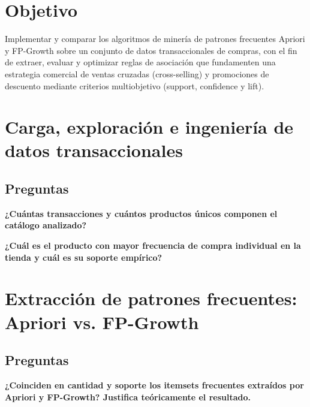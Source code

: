 \documentclass[letterpaper,11pt]{article}
\begin{document}
\begingroup
\onehalfspacing


\endgroup

\clearpage
{
  \makeatletter
  \let\ps@plain\ps@indice
  \makeatother
  \pagestyle{indice}
  \thispagestyle{indice}
  \hypersetup{linkcolor=black}\tableofcontents
  \thispagestyle{indice}
}
\clearpage


\setcounter{page}{1}


\section{Objetivo}

Implementar y comparar los algoritmos de minería de patrones frecuentes Apriori y FP-Growth sobre un
conjunto de datos transaccionales de compras, con el fin de extraer, evaluar y optimizar reglas de asociación
que fundamenten una estrategia comercial de ventas cruzadas (cross-selling) y promociones de descuento
mediante criterios multiobjetivo (support, confidence y lift).

\newpage

\section{Carga, exploración e ingeniería de datos transaccionales}

\subsection{Preguntas}

\textbf{¿Cuántas transacciones y cuántos productos únicos componen el catálogo analizado?}

\textbf{¿Cuál es el producto con mayor frecuencia de compra individual en la tienda y cuál es su soporte
empírico?}

\newpage

\section{Extracción de patrones frecuentes: Apriori vs. FP-Growth}

\subsection{Preguntas}

\textbf{¿Coinciden en cantidad y soporte los itemsets frecuentes extraídos por Apriori y FP-Growth?
Justifica teóricamente el resultado.}
\end{document}
